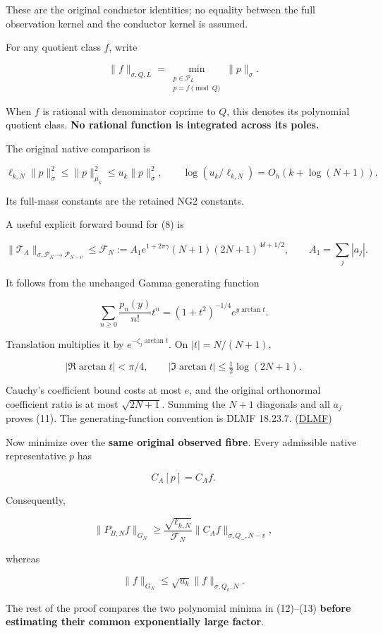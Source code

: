 \documentclass[11pt]{article}
\begin{document}
These are the original conductor identities; no equality between the full observation kernel and the conductor kernel is assumed.

For any quotient class \(f\), write

\[
\|f\|_{\sigma,Q,L}
=
\min_{\substack{p\in\mathcal P_L\\p=f\pmod Q}}\|p\|_\sigma.
\]

When \(f\) is rational with denominator coprime to \(Q\), this denotes its polynomial quotient class. \textbf{No rational function is integrated across its poles.}

The original native comparison is

\[
\ell_{k,N}\|p\|_\sigma^2
\le\|p\|_{\mu_k}^2
\le u_k\|p\|_\sigma^2,
\qquad
\log(u_k/\ell_{k,N})=O_h(k+\log(N+1)).
\tag{10}
\]

Its full-mass constants are the retained NG2 constants.

A useful explicit forward bound for (8) is

\[
\boxed{
\|\mathcal T_A\|_{\sigma,\mathcal P_N\to\mathcal P_{N-v}}
\le
\mathcal F_N
:=
A_1e^{1+2\pi\gamma}(N+1)(2N+1)^{4\delta+1/2},
\qquad A_1=\sum_j|a_j|.
}
\tag{11}
\]

It follows from the unchanged Gamma generating function

\[
\sum_{n\ge0}\frac{p_n(y)}{n!}t^n
=(1+t^2)^{-1/4}e^{y\arctan t}.
\]

Translation multiplies it by \(e^{-\zeta_j\arctan t}\). On \(|t|=N/(N+1)\),

\[
|\Re\arctan t|<\pi/4,\qquad
|\Im\arctan t|\le\tfrac12\log(2N+1).
\]

Cauchy's coefficient bound costs at most \(e\), and the original orthonormal coefficient ratio is at most \(\sqrt{2N+1}\). Summing the \(N+1\) diagonals and all \(a_j\) proves (11). The generating-function convention is DLMF 18.23.7. (\href{https://dlmf.nist.gov/18.23}{DLMF})

Now minimize over the \textbf{same original observed fibre}. Every admissible native representative \(p\) has

\[
C_A[p]=C_Af.
\]

Consequently,

\[
\boxed{
\|P_{B,N}f\|_{G_N}
\ge
\frac{\sqrt{\ell_{k,N}}}{\mathcal F_N}
\|C_Af\|_{\sigma,Q_-,N-v},
}
\tag{12}
\]

whereas

\[
\boxed{
\|f\|_{G_N}
\le\sqrt{u_k}\|f\|_{\sigma,Q_k,N}.
}
\tag{13}
\]

The rest of the proof compares the two polynomial minima in (12)--(13) \textbf{before estimating their common exponentially large factor}.
\end{document}
